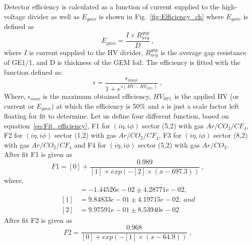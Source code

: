 Detector efficiency is calculated as a function of current supplied to the high-voltage divider as well as $E_{gain}$ is shown in Fig.~\ref{fig:Efficiency_ch} where $E_{gain}$ is defined as
\begin{equation}
E_{gain} = \frac{I\times R_{avg}^{gap}}{D}~,
\end{equation}
where $I$ is current supplied to the HV divider, $R_{avg}^{gap}$ is the average gap resistance of GE1/1, and D is thickness of the GEM foil.
The efficiency is fitted with the function defined as:
\begin{equation}\label{eq:Fit_efficiency}
    \epsilon = \frac{\epsilon_{max}}{1+e^{s(HV-HV_{50\%})}}~,
\end{equation}
Where, $\epsilon_{max}$ is the maximum obtained efficiency, $HV_{50\%}$ is the applied HV (or current or $E_{gain}$) at which the efficiency is 50\% and $s$ is just a scale factor left floating for fit to determine.
Let us define four different function, based on equation~\ref{eq:Fit_efficiency}, F1 for $(i\eta,i\phi)$ sector (5,2) with gas $Ar/CO_2/CF_4$, F2 for $(i\eta,i\phi)$ sector (1,2) with gas $Ar/CO_2/CF_4$, F3 for $(i\eta,i\phi)$ sector (8,2) with gas $Ar/CO_2/CF_4$ and F4 for $(i\eta,i\phi)$ sector (5,2) with gas $Ar/CO_2$.\\
After fit F1 is given as
\begin{equation}
    F1 = [0] + \frac{0.989}{[1]+exp(-[2]\times(x-697.3))}~,
\end{equation}
where,
\begin{align*}
[0] &= -1.44526e-02 \pm 4.28771e-02,\\
[1] &= 9.84833e-01 \pm 4.19715e-02,~and \\
[2] &= 9.97591e-01 \pm 8.53940e-02
\end{align*}
After fit F2 is given as
\begin{equation}
    F2 = \frac{0.968}{[0]+exp(-[1]\times(x-64.9))}~,
\end{equation}
